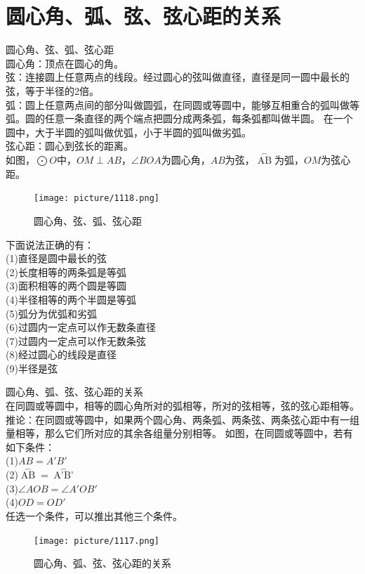 \documentclass{ecnuthesis}
\begin{document}
\section{圆心角、弧、弦、弦心距的关系}
\begin{knowledge}
    圆心角、弦、弧、弦心距 \\
    圆心角：顶点在圆心的角。 \\
    弦：连接圆上任意两点的线段。经过圆心的弦叫做直径，直径是同一圆中最长的弦，等于半径的2倍。\\
    弧：圆上任意两点间的部分叫做圆弧，在同圆或等圆中，能够互相重合的弧叫做等弧。圆的任意一条直径的两个端点把圆分成两条弧，每条弧都叫做半圆。
    在一个圆中，大于半圆的弧叫做优弧，小于半圆的弧叫做劣弧。\\
    弦心距：圆心到弦长的距离。 \\
    如图，$\bigodot O$中，$OM\perp AB$，$\angle BOA$为圆心角，$AB$为弦，$\mathop{AB}\limits^\frown$为弧，$OM$为弦心距。
\end{knowledge}
\begin{figure}[H]
\centering
\texttt{[image: picture/1118.png]}
\caption{圆心角、弦、弧、弦心距}
\end{figure}
\begin{problem}
    下面说法正确的有：\\
    (1)直径是圆中最长的弦 \\
    (2)长度相等的两条弧是等弧 \\
    (3)面积相等的两个圆是等圆 \\
    (4)半径相等的两个半圆是等弧 \\
    (5)弧分为优弧和劣弧 \\
    (6)过圆内一定点可以作无数条直径 \\
    (7)过圆内一定点可以作无数条弦 \\
    (8)经过圆心的线段是直径 \\
    (9)半径是弦
\end{problem}
\begin{knowledge}
    圆心角、弧、弦、弦心距的关系 \\
    在同圆或等圆中，相等的圆心角所对的弧相等，所对的弦相等，弦的弦心距相等。\\
    推论：在同圆或等圆中，如果两个圆心角、两条弧、两条弦、两条弦心距中有一组量相等，那么它们所对应的其余各组量分别相等。
    如图，在同圆或等圆中，若有如下条件： \\
    (1)$AB=A'B'$ \\
    (2)$\mathop{AB}\limits^{\frown}=\mathop{A'B'}\limits^{\frown}$ \\
    (3)$\angle AOB=\angle A'OB'$ \\
    (4)$OD=OD'$ \\
    任选一个条件，可以推出其他三个条件。
\end{knowledge}
\begin{figure}[H]
\centering
\texttt{[image: picture/1117.png]}
\caption{圆心角、弧、弦、弦心距的关系}
\end{figure}
\clearpage
\end{document}
